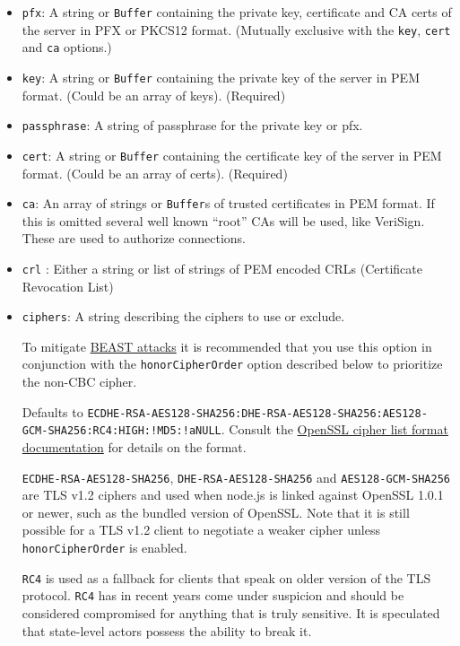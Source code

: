 \begin{itemize}
\item
  \texttt{pfx}: A string or \texttt{Buffer} containing the private key,
  certificate and CA certs of the server in PFX or PKCS12 format.
  (Mutually exclusive with the \texttt{key}, \texttt{cert} and
  \texttt{ca} options.)
\item
  \texttt{key}: A string or \texttt{Buffer} containing the private key
  of the server in PEM format. (Could be an array of keys). (Required)
\item
  \texttt{passphrase}: A string of passphrase for the private key or
  pfx.
\item
  \texttt{cert}: A string or \texttt{Buffer} containing the certificate
  key of the server in PEM format. (Could be an array of certs).
  (Required)
\item
  \texttt{ca}: An array of strings or \texttt{Buffer}s of trusted
  certificates in PEM format. If this is omitted several well known
  ``root'' CAs will be used, like VeriSign. These are used to authorize
  connections.
\item
  \texttt{crl} : Either a string or list of strings of PEM encoded CRLs
  (Certificate Revocation List)
\item
  \texttt{ciphers}: A string describing the ciphers to use or exclude.

  To mitigate
  \href{http://blog.ivanristic.com/2011/10/mitigating-the-beast-attack-on-tls.html}{BEAST
  attacks} it is recommended that you use this option in conjunction
  with the \texttt{honorCipherOrder} option described below to
  prioritize the non-CBC cipher.

  Defaults to
  \texttt{ECDHE-RSA-AES128-SHA256:DHE-RSA-AES128-SHA256:AES128-GCM-SHA256:RC4:HIGH:!MD5:!aNULL}.
  Consult the
  \href{http://www.openssl.org/docs/apps/ciphers.html\#CIPHER_LIST_FORMAT}{OpenSSL
  cipher list format documentation} for details on the format.

  \texttt{ECDHE-RSA-AES128-SHA256}, \texttt{DHE-RSA-AES128-SHA256} and
  \texttt{AES128-GCM-SHA256} are TLS v1.2 ciphers and used when node.js
  is linked against OpenSSL 1.0.1 or newer, such as the bundled version
  of OpenSSL. Note that it is still possible for a TLS v1.2 client to
  negotiate a weaker cipher unless \texttt{honorCipherOrder} is enabled.

  \texttt{RC4} is used as a fallback for clients that speak on older
  version of the TLS protocol. \texttt{RC4} has in recent years come
  under suspicion and should be considered compromised for anything that
  is truly sensitive. It is speculated that state-level actors possess
  the ability to break it.


\end{itemize}
